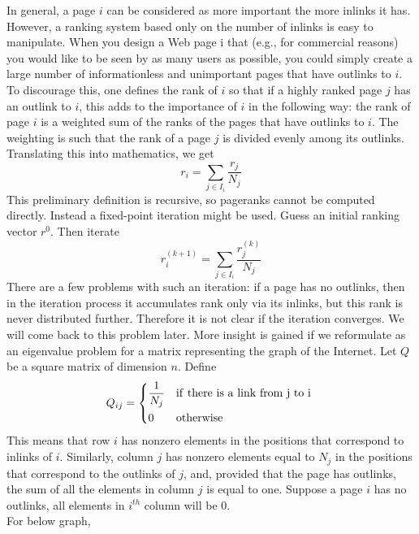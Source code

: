 \documentclass[a4paper]{article}
\begin{document}
In general, a page $i$ can be considered as more important the more inlinks
it has. However, a ranking system based only on the number of inlinks is easy to
manipulate. When you design a Web page i that (e.g., for commercial reasons)
you would like to be seen by as many users as possible, you could simply create a large number of informationless and unimportant pages that have outlinks to $i$.
To discourage this, one defines the rank of $i$ so that if a highly ranked page $j$ has an
outlink to $i$, this adds to the importance of $i$ in the following way: the rank of page
$i$ is a weighted sum of the ranks of the pages that have outlinks to $i$. The weighting
is such that the rank of a page $j$ is divided evenly among its outlinks. Translating
this into mathematics, we get
\[ r_i = \sum_{j \in I_i} \frac{r_j}{N_j}  \]
This preliminary definition is recursive, so pageranks cannot be computed directly.
Instead a fixed-point iteration might be used. Guess an initial ranking vector $r^0$.
Then iterate
\[ r_i^{(k+1)} = \sum_{j \in I_i} \frac{r_j^{(k)}}{N_j}  \]
There are a few problems with such an iteration: if a page has no outlinks, then
in the iteration process it accumulates rank only via its inlinks, but this rank is
never distributed further. Therefore it is not clear if the iteration converges. We
will come back to this problem later.
More insight is gained if we reformulate as an eigenvalue problem for
a matrix representing the graph of the Internet. Let $Q$ be a square matrix of
dimension $n$. Define
\[
    Q_{ij} = \begin{dcases}
    \frac{1}{N_j}   &  \mathrm{if \ there \ is \ a \ link\ from\ j\ to\ i}\                   \\
    0   &  \mathrm{otherwise}        \\
      \end{dcases}
    \]
This means that row $i$ has nonzero elements in the positions that correspond to
inlinks of $i$. Similarly, column $j$ has nonzero elements equal to $ N_j$ in the positions
that correspond to the outlinks of $j$, and, provided that the page has outlinks, the
sum of all the elements in column $j$ is equal to one. Suppose a page $i$ has no outlinks, all elements in $i^{th}$ column will be 0.  
\\
For below graph, 
\begin{center}

\end{center}
\end{document}
